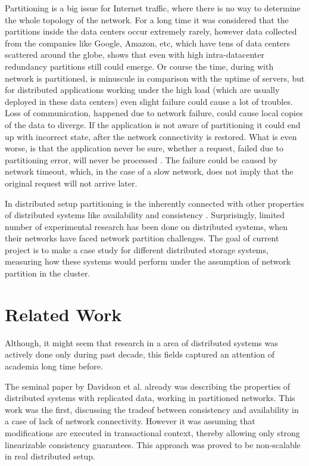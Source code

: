 \documentclass[a4paper]{article}
\begin{document}
Partitioning is a big issue for Internet traffic, where there is no way to determine the whole topology of the network.
For a long time it was considered that the partitions inside the data centers occur extremely rarely, however data \cite{aphyrNetworkStatics,dean2009designs} collected from the companies like Google, Amazon, etc, which have tens of data centers scattered around the globe, shows that even with high intra-datacenter redundancy partitions still could emerge.
Or course the time, during with network is partitioned, is minuscule in comparison with the uptime of servers, but for distributed applications working under the high load (which are usually deployed in these data centers) even slight failure could cause a lot of troubles.
Loss of communication, happened due to network failure, could cause local copies of the data to diverge.
If the application is not aware of partitioning it could end up with incorrect state, after the network connectivity is restored.
What is even worse, is that the application never be sure, whether a request, failed due to partitioning error, will never be processed . 
The failure could be caused by network timeout, which, in the case of a slow network, does not imply that the original request will not arrive later.

In distributed setup partitioning is the inherently connected with other properties of distributed systems like availability and consistency \cite{brewer2000towards}.
Surprisingly, limited number of experimental research has been done on distributed systems, when their networks have faced network partition challenges. 
The goal of current project is to make a case study for different distributed storage systems, measuring how these systems would perform under the assumption of network partition in the cluster.

\section{Related Work}

Although, it might seem that research in a area of distributed systems was actively done only during past decade, this fields captured an attention of academia long time before.

The seminal paper by Davidson et al. \cite{Davidson:1985:CPN:5505.5508} already was describing the properties of distributed systems with replicated data, working in partitioned networks.
This work was the first, discussing the tradeof between consistency and availability in a case of lack of network connectivity.
However it was assuming that modifications are executed in transactional context, thereby allowing only strong linearizable consistency guarantees.
This approach was proved to be non-scalable in real distributed setup.
\end{document}

